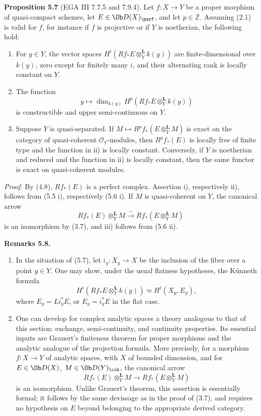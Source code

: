 \textbf{Proposition 5.7} (EGA III 7.7.5 and 7.9.4). Let \(f:X\to Y\) be a proper morphism of quasi-compact schemes, let \(E\in\Ob D(X)_{\parf}\), and let \(p\in\mathbb Z\). Assuming (2.1) is valid for \(f\), for instance if \(f\) is projective or if \(Y\) is noetherian, the following hold:
\begin{enumerate}[label=\roman*)]
\item For \(y\in Y\), the vector spaces \(H^i(Rf_*E\otimes_Y^{\mathbf L}k(y))\) are finite-dimensional over \(k(y)\), zero except for finitely many \(i\), and their alternating rank is locally constant on \(Y\).
\item The function
\[
 y\longmapsto \dim_{k(y)}H^p(Rf_*E\otimes_Y^{\mathbf L}k(y))
\]
is constructible and upper semi-continuous on \(Y\).
\item Suppose \(Y\) is quasi-separated. If \(M\mapsto R^pf_*(E\otimes_Y^{\mathbf L}M)\) is exact on the category of quasi-coherent \(\mathcal O_Y\)-modules, then \(R^pf_*(E)\) is locally free of finite type and the function in ii) is locally constant. Conversely, if \(Y\) is noetherian and reduced and the function in ii) is locally constant, then the same functor is exact on quasi-coherent modules.
\end{enumerate}

\emph{Proof.} By (4.8), \(Rf_*(E)\) is a perfect complex. Assertion i), respectively ii), follows from (5.5 i), respectively (5.6 i). If \(M\) is quasi-coherent on \(Y\), the canonical arrow
\[
 Rf_*(E)\otimes_Y^{\mathbf L}M
 \xrightarrow{\sim}
 Rf_*(E\otimes_Y^{\mathbf L}M)
\]
is an isomorphism by (3.7), and iii) follows from (5.6 ii).

\textbf{Remarks 5.8.}
\begin{enumerate}[label=\alph*)]
\item In the situation of (5.7), let \(i_y:X_y\to X\) be the inclusion of the fiber over a point \(y\in Y\). One may show, under the usual flatness hypotheses, the Künneth formula
\[
 H^i(Rf_*E\otimes_Y^{\mathbf L}k(y))
 \simeq H^i(X_y,E_y),
\]
where \(E_y=Li_y^*E\), or \(E_y=i_y^*E\) in the flat case.
\item One can develop for complex analytic spaces a theory analogous to that of this section: exchange, semi-continuity, and continuity properties. Its essential inputs are Grauert's finiteness theorem for proper morphisms and the analytic analogue of the projection formula. More precisely, for a morphism \(f:X\to Y\) of analytic spaces, with \(X\) of bounded dimension, and for \(E\in\Ob D(X)\), \(M\in\Ob D(Y)_{\coh}\), the canonical arrow
\[
 Rf_*(E)\otimes_Y^{\mathbf L}M
 \longrightarrow
 Rf_*(E\otimes_Y^{\mathbf L}M)
\]
is an isomorphism. Unlike Grauert's theorem, this assertion is essentially formal; it follows by the same devissage as in the proof of (3.7), and requires no hypothesis on \(E\) beyond belonging to the appropriate derived category.
\end{enumerate}

